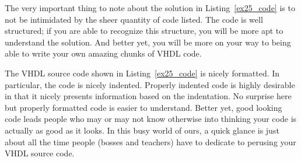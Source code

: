 \begin{my_list}
\item The very important thing to note about the solution in Listing~\ref{ex25_code} is to not be intimidated by the sheer quantity of code listed. The code is well structured; if you are able to recognize this structure, you will be more apt to understand the solution. And better yet, you will be more on your way to being able to write your own amazing chunks of VHDL code.

\item The VHDL source code shown in Listing~\ref{ex25_code} is nicely formatted. In particular, the code is nicely indented. Properly indented code is highly desirable in that it nicely presents information based on the indentation. No surprise here but properly formatted code is easier to understand. Better yet, good looking code leads people who may or may not know otherwise into thinking your code is actually as good as it looks. In this busy world of ours, a quick glance is just about all the time people (bosses and teachers) have to dedicate to perusing your VHDL source code.
\end{my_list}

